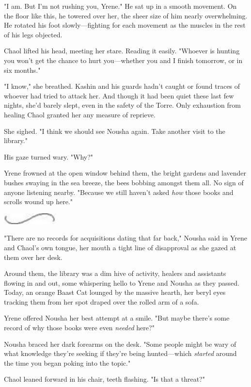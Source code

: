 "I am. But I'm not rushing you, Yrene." He sat up in a smooth movement. On the floor like this, he towered over her, the sheer size of him nearly overwhelming. He rotated his foot slowly---fighting for each movement as the muscles in the rest of his legs objected.

Chaol lifted his head, meeting her stare. Reading it easily. "Whoever is hunting you won't get the chance to hurt you---whether you and I finish tomorrow, or in six months."

"I know," she breathed. Kashin and his guards hadn't caught or found traces of whoever had tried to attack her. And though it had been quiet these last few nights, she'd barely slept, even in the safety of the Torre. Only exhaustion from healing Chaol granted her any measure of reprieve.

She sighed. "I think we should see Nousha again. Take another visit to the library."

His gaze turned wary. "Why?"

Yrene frowned at the open window behind them, the bright gardens and lavender bushes swaying in the sea breeze, the bees bobbing amongst them all. No sign of anyone listening nearby. "Because we still haven't asked \emph{how} those books and scrolls wound up here."

\includegraphics[width=1.12in,height=0.24in]{images/seperator}

"There are no records for acquisitions dating that far back," Nousha said in Yrene and Chaol's own tongue, her mouth a tight line of disapproval as she gazed at them over her desk.

Around them, the library was a dim hive of activity, healers and assistants flowing in and out, some whispering hello to Yrene and Nousha as they passed. Today, an orange Baast Cat lounged by the massive hearth, her beryl eyes tracking them from her spot draped over the rolled arm of a sofa.

Yrene offered Nousha her best attempt at a smile. "But maybe there's some record of why those books were even \emph{needed} here?"

Nousha braced her dark forearms on the desk. "Some people might be wary of what knowledge they're seeking if they're being hunted---which
\emph{started} around the time you began poking into the topic."

Chaol leaned forward in his chair, teeth flashing. "Is that a threat?"

